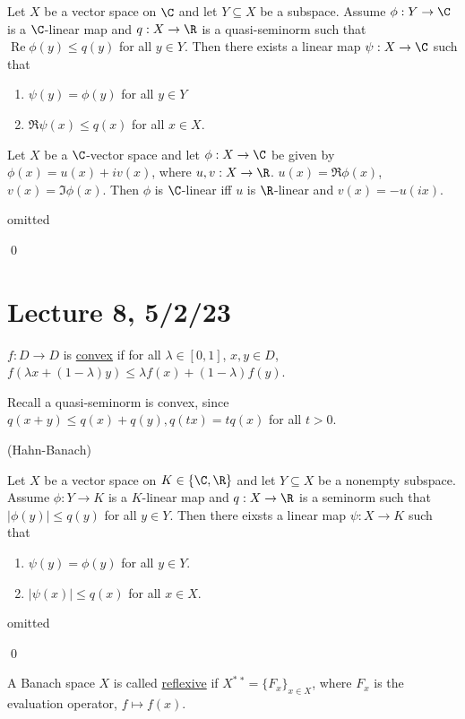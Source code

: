 \documentclass[x11names,reqno,14pt]{extarticle}
\begin{document}
Let $X$ be a vector space on $\C$ and let $ Y \subseteq X$ be a subspace. Assume $\phi:Y\to\C$ is a $\C$-linear map and $q:X\to\R$ is a quasi-seminorm such that $\operatorname{Re}\phi(y) \leq q(y)$ for all $y \in Y$. Then there exists a linear map $\psi:X\to\C$ such that
\begin{enumerate}[label=(\roman*)]
\item $\psi(y) = \phi(y)$ for all $y \in Y$
\item $\Re\psi(x) \leq q(x)$ for all $x \in X$. 
\end{enumerate}

\lem 

Let $X$ be a $\C$-vector space and let $\phi:X\to\C$ be given by $\phi(x) = u(x) + iv(x)$, where $u, v:X\to\R$. $u(x) = \Re\phi(x)$, $v(x)= \Im\phi(x)$. Then $\phi$ is $\C$-linear iff $u$ is $\R$-linear and $v(x) = -u(ix)$.

\proof

omitted

\qed

\section*{Lecture 8, 5/2/23}


$f:D\to D$ is \underline{convex} if for all $\lambda \in [0, 1]$, $x, y \in D$, $f(\lambda x + (1 - \lambda)y) \leq \lambda f(x) + (1 - \lambda)f(y)$. 

Recall a quasi-seminorm is convex, since $q(x + y) \leq q(x) + q(y), q(tx) = tq(x)$ for all $t > 0$. 

\thm (Hahn-Banach)

Let $X$ be a vector space on $K\in\{\C,\R\}$ and let $Y \subseteq X$ be a nonempty subspace. Assume $\phi:Y\to K$ is a $K$-linear map and $q:X\to\R$ is a seminorm such that $|\phi(y)| \leq q(y)$ for all $y \in Y$. Then there eixsts a linear map $\psi:X\to K$ such that
\begin{enumerate}[label=(\roman*)]
\item $\psi(y) = \phi(y)$ for all $y \in Y$. 
\item $|\psi(x)| \leq q(x)$ for all $x \in X$. 
\end{enumerate}

\proof

omitted

\qed


A Banach space $X$ is called \underline{reflexive} if $X^*\,^* = \{F_x\}_{x\in X}$, where $F_x$ is the evaluation operator, $f \mapsto f(x)$. 
\end{document}
